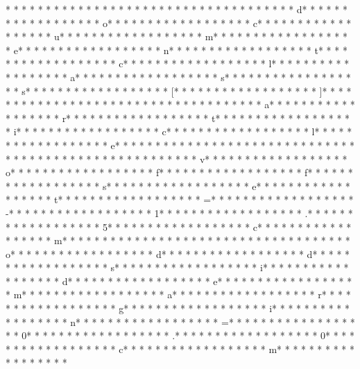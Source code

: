 * * *  * * *  * * *  *  * * *  *  * * *  * 
* * *  * * *  * * *  *  * * *  *  * * *  * d* * *  * * *  * * *  *  * * *  *  * * *  * o* * *  * * *  * * *  *  * * *  *  * * *  * c* * *  * * *  * * *  *  * * *  *  * * *  * u* * *  * * *  * * *  *  * * *  *  * * *  * m* * *  * * *  * * *  *  * * *  *  * * *  * e* * *  * * *  * * *  *  * * *  *  * * *  * n* * *  * * *  * * *  *  * * *  *  * * *  * t* * *  * * *  * * *  *  * * *  *  * * *  * c* * *  * * *  * * *  *  * * *  *  * * *  * l* * *  * * *  * * *  *  * * *  *  * * *  * a* * *  * * *  * * *  *  * * *  *  * * *  * s* * *  * * *  * * *  *  * * *  *  * * *  * s* * *  * * *  * * *  *  * * *  *  * * *  * [* * *  * * *  * * *  *  * * *  *  * * *  * ]* * *  * * *  * * *  *  * * *  *  * * *  * {* * *  * * *  * * *  *  * * *  *  * * *  * a* * *  * * *  * * *  *  * * *  *  * * *  * r* * *  * * *  * * *  *  * * *  *  * * *  * t* * *  * * *  * * *  *  * * *  *  * * *  * i* * *  * * *  * * *  *  * * *  *  * * *  * c* * *  * * *  * * *  *  * * *  *  * * *  * l* * *  * * *  * * *  *  * * *  *  * * *  * e* * *  * * *  * * *  *  * * *  *  * * *  * }* * *  * * *  * * *  *  * * *  *  * * *  * 
* * *  * * *  * * *  *  * * *  *  * * *  * v* * *  * * *  * * *  *  * * *  *  * * *  * o* * *  * * *  * * *  *  * * *  *  * * *  * f* * *  * * *  * * *  *  * * *  *  * * *  * f* * *  * * *  * * *  *  * * *  *  * * *  * s* * *  * * *  * * *  *  * * *  *  * * *  * e* * *  * * *  * * *  *  * * *  *  * * *  * t* * *  * * *  * * *  *  * * *  *  * * *  * =* * *  * * *  * * *  *  * * *  *  * * *  * -* * *  * * *  * * *  *  * * *  *  * * *  * 1* * *  * * *  * * *  *  * * *  *  * * *  * .* * *  * * *  * * *  *  * * *  *  * * *  * 5* * *  * * *  * * *  *  * * *  *  * * *  * c* * *  * * *  * * *  *  * * *  *  * * *  * m* * *  * * *  * * *  *  * * *  *  * * *  * 
* * *  * * *  * * *  *  * * *  *  * * *  * o* * *  * * *  * * *  *  * * *  *  * * *  * d* * *  * * *  * * *  *  * * *  *  * * *  * d* * *  * * *  * * *  *  * * *  *  * * *  * s* * *  * * *  * * *  *  * * *  *  * * *  * i* * *  * * *  * * *  *  * * *  *  * * *  * d* * *  * * *  * * *  *  * * *  *  * * *  * e* * *  * * *  * * *  *  * * *  *  * * *  * m* * *  * * *  * * *  *  * * *  *  * * *  * a* * *  * * *  * * *  *  * * *  *  * * *  * r* * *  * * *  * * *  *  * * *  *  * * *  * g* * *  * * *  * * *  *  * * *  *  * * *  * i* * *  * * *  * * *  *  * * *  *  * * *  * n* * *  * * *  * * *  *  * * *  *  * * *  * =* * *  * * *  * * *  *  * * *  *  * * *  * 0* * *  * * *  * * *  *  * * *  *  * * *  * .* * *  * * *  * * *  *  * * *  *  * * *  * 0* * *  * * *  * * *  *  * * *  *  * * *  * c* * *  * * *  * * *  *  * * *  *  * * *  * m* * *  * * *  * * *  *  * * *  *  * * *  * 
